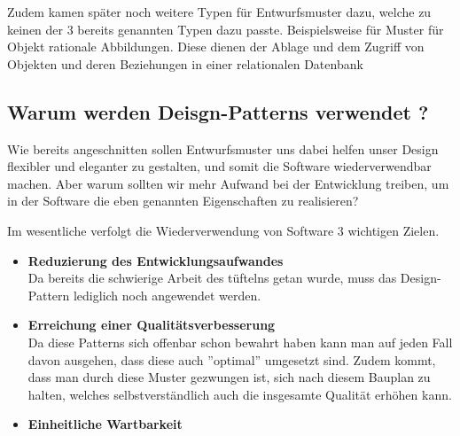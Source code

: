 	Zudem kamen später noch weitere Typen für Entwurfsmuster dazu, welche zu keinen der 3 bereits genannten Typen dazu passte. Beispielsweise für Muster für Objekt rationale Abbildungen.
	Diese dienen der Ablage und dem Zugriff von Objekten und deren Beziehungen in einer relationalen Datenbank


\clearpage


	\subsection{Warum werden Deisgn-Patterns verwendet ?}
	Wie bereits angeschnitten sollen Entwurfsmuster uns dabei helfen unser Design flexibler und eleganter zu gestalten, und somit die Software wiederverwendbar machen. Aber warum sollten wir mehr Aufwand bei der Entwicklung treiben, um in der Software die eben
	genannten Eigenschaften zu realisieren?
	
	Im wesentliche verfolgt die Wiederverwendung von Software 3 wichtigen Zielen.
	
	\begin{itemize}
		\item[\Checkmark] \textbf{Reduzierung des Entwicklungsaufwandes}\\
		Da bereits die schwierige Arbeit des tüftelns getan wurde, muss das Design-Pattern lediglich noch angewendet werden.
		
		\item[\Checkmark] \textbf{Erreichung einer Qualitätsverbesserung}\\
		Da diese Patterns sich offenbar schon bewahrt haben kann man auf jeden Fall davon ausgehen, dass diese auch ''optimal'' umgesetzt sind. Zudem kommt, dass man durch diese Muster gezwungen ist, sich nach diesem Bauplan zu halten, welches selbstverständlich auch die insgesamte Qualität erhöhen kann.
		
		\item[\Checkmark] \textbf{Einheitliche Wartbarkeit}\\
		
	\end{itemize}
	

\clearpage






